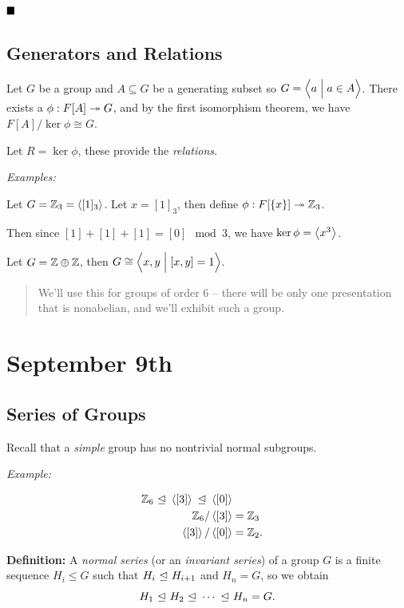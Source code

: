 \(\qed\)

\hypertarget{generators-and-relations}{%
\subsection{Generators and Relations}\label{generators-and-relations}}

Let \(G\) be a group and \(A \subseteq G\) be a generating subset so
\(G = \left\langle{a \mathrel{\Big|}a\in A}\right\rangle\). There exists a
\(\phi: F[A] \twoheadrightarrow G\), and by the first isomorphism theorem, we
have \(F[A] / \ker \phi \cong G\).

Let \(R = \ker \phi\), these provide the \emph{relations}.

\emph{Examples:}

Let \(G = {\mathbb{Z}}_3 = \left\langle{[1]_3}\right\rangle\). Let \(x = [1]_3\), then define
\(\phi: F[\left\{{x}\right\}] \twoheadrightarrow {\mathbb{Z}}_3\).

Then since \([1] + [1] + [1] = [0] \mod 3\), we have
\(\ker \phi = \left\langle{x^3}\right\rangle\).

Let \(G = {\mathbb{Z}} \oplus {\mathbb{Z}}\), then
\(G \cong \left\langle{x,y \mathrel{\Big|}[x,y] = 1}\right\rangle\).

\begin{quote}
We'll use this for groups of order 6 -- there will be only one
presentation that is nonabelian, and we'll exhibit such a group.
\end{quote}

\hypertarget{september-9th}{%
\section{September 9th}\label{september-9th}}

\hypertarget{series-of-groups}{%
\subsection{Series of Groups}\label{series-of-groups}}

Recall that a \emph{simple} group has no nontrivial normal subgroups.

\emph{Example:}

\begin{align*}
{\mathbb{Z}}_6 {~\trianglelefteq~} \left\langle{[3]}\right\rangle {~\trianglelefteq~} \left\langle{[0]}\right\rangle \\
{\mathbb{Z}}_6 / \left\langle{[3]}\right\rangle &= {\mathbb{Z}}_3 \\
\left\langle{[3]}\right\rangle / \left\langle{[0]}\right\rangle &= {\mathbb{Z}}_2
.\end{align*}

\textbf{Definition:} A \emph{normal series} (or an \emph{invariant
series}) of a group \(G\) is a finite sequence \(H_i \leq G\) such that
\(H_i {~\trianglelefteq~} H_{i+1}\) and \(H_n = G\), so we obtain \[
H_1 {~\trianglelefteq~} H_2 {~\trianglelefteq~} \cdots {~\trianglelefteq~} H_n = G
.\]

